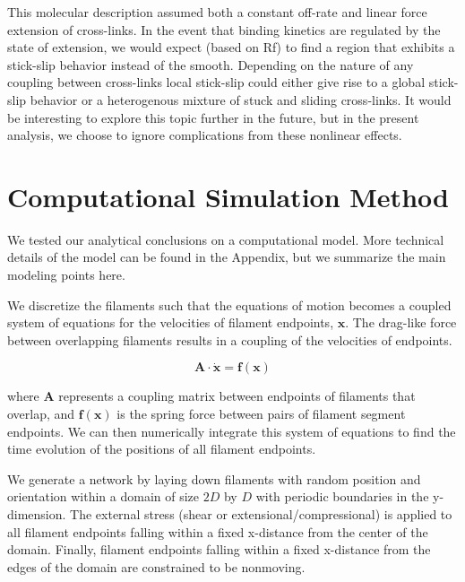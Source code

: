 \documentclass[pre,preprint]{revtex4-1}
\begin{document}
This molecular description assumed both a constant off-rate and linear force extension of cross-links.  In the event that binding kinetics are regulated by the state of extension, we would expect (based on Rf) to find a region that exhibits a stick-slip behavior instead of the smooth.  Depending on the nature of any coupling between cross-links local stick-slip could either give rise to a global stick-slip behavior or a heterogenous mixture of stuck and sliding cross-links.  It would be interesting to explore this topic further in the future, but in the present analysis, we choose to ignore complications from these nonlinear effects.







\section{Computational Simulation Method}

We tested our analytical conclusions on a computational model.  More technical details of the model can be found in the Appendix, but we summarize the main modeling points here.

We discretize the filaments such that the equations of motion becomes a coupled system of equations for the velocities of filament endpoints, $\mathbf{x}$.  The drag-like force between overlapping filaments results in a coupling of the velocities of endpoints.  

\begin{equation}
\mathbf{A \cdot \dot x} = \mathbf{f(x)}
\end{equation}

where $\mathbf{A }$ represents a coupling matrix between endpoints of filaments that overlap, and $\mathbf{f(x)}$ is the spring force between pairs of filament segment endpoints.  We can then numerically integrate this system of equations to find the time evolution of the positions of all filament endpoints.

We generate a network by laying down filaments with random position and orientation within a domain of size $2D$ by $D$ with periodic boundaries in the y-dimension.  The external stress (shear or extensional/compressional) is applied to all filament endpoints falling within a fixed x-distance from the center of the domain.  Finally, filament endpoints falling within a fixed x-distance from the edges of the domain are constrained to be nonmoving.
\end{document}
